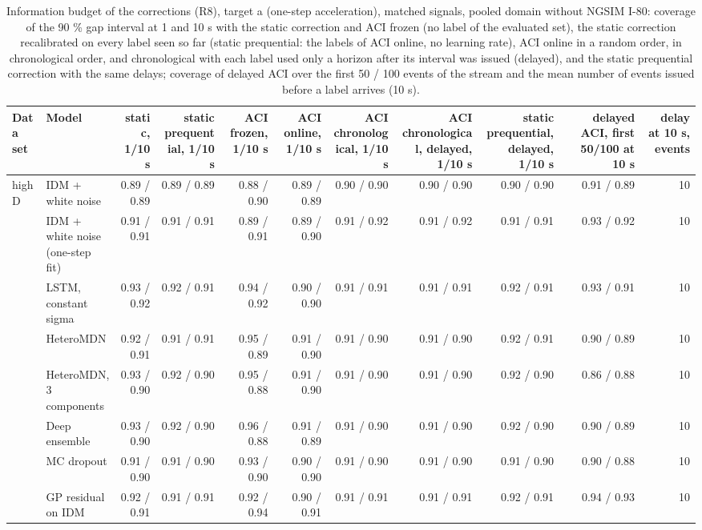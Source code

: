 \begin{table}[htbp]
\centering
\footnotesize
\caption{Information budget of the corrections (R8), target a (one-step acceleration), matched signals, pooled domain without NGSIM I-80: coverage of the 90 \% gap interval at 1 and 10 s with the static correction and ACI frozen (no label of the evaluated set), the static correction recalibrated on every label seen so far (static prequential: the labels of ACI online, no learning rate), ACI online in a random order, in chronological order, and chronological with each label used only a horizon after its interval was issued (delayed), and the static prequential correction with the same delays; coverage of delayed ACI over the first 50 / 100 events of the stream and the mean number of events issued before a label arrives (10 s).}
\label{tab:t4-info-budget--lodo-ngsim--a}
\begin{tabular}{llrrrrrrrrr}
\toprule
Data set & Model & static, 1/10 s & static prequential, 1/10 s & ACI frozen, 1/10 s & ACI online, 1/10 s & ACI chronological, 1/10 s & ACI chronological, delayed, 1/10 s & static prequential, delayed, 1/10 s & delayed ACI, first 50/100 at 10 s & delay at 10 s, events \\
\midrule
highD & IDM + white noise & 0.89 / 0.89 & 0.89 / 0.89 & 0.88 / 0.90 & 0.89 / 0.89 & 0.90 / 0.90 & 0.90 / 0.90 & 0.90 / 0.90 & 0.91 / 0.89 & 10 \\
 & IDM + white noise (one-step fit) & 0.91 / 0.91 & 0.91 / 0.91 & 0.89 / 0.91 & 0.89 / 0.90 & 0.91 / 0.92 & 0.91 / 0.92 & 0.91 / 0.91 & 0.93 / 0.92 & 10 \\
 & LSTM, constant sigma & 0.93 / 0.92 & 0.92 / 0.91 & 0.94 / 0.92 & 0.90 / 0.90 & 0.91 / 0.91 & 0.91 / 0.91 & 0.92 / 0.91 & 0.93 / 0.91 & 10 \\
 & HeteroMDN & 0.92 / 0.91 & 0.91 / 0.91 & 0.95 / 0.89 & 0.91 / 0.90 & 0.91 / 0.90 & 0.91 / 0.90 & 0.92 / 0.91 & 0.90 / 0.89 & 10 \\
 & HeteroMDN, 3 components & 0.93 / 0.90 & 0.92 / 0.90 & 0.95 / 0.88 & 0.91 / 0.90 & 0.91 / 0.90 & 0.91 / 0.90 & 0.92 / 0.90 & 0.86 / 0.88 & 10 \\
 & Deep ensemble & 0.93 / 0.90 & 0.92 / 0.90 & 0.96 / 0.88 & 0.91 / 0.89 & 0.91 / 0.90 & 0.91 / 0.90 & 0.92 / 0.90 & 0.90 / 0.89 & 10 \\
 & MC dropout & 0.91 / 0.90 & 0.91 / 0.90 & 0.93 / 0.90 & 0.90 / 0.90 & 0.91 / 0.90 & 0.91 / 0.90 & 0.91 / 0.90 & 0.90 / 0.88 & 10 \\
 & GP residual on IDM & 0.92 / 0.91 & 0.91 / 0.91 & 0.92 / 0.94 & 0.90 / 0.91 & 0.91 / 0.91 & 0.91 / 0.91 & 0.92 / 0.91 & 0.94 / 0.93 & 10 \\

\end{tabular}
\end{table}
